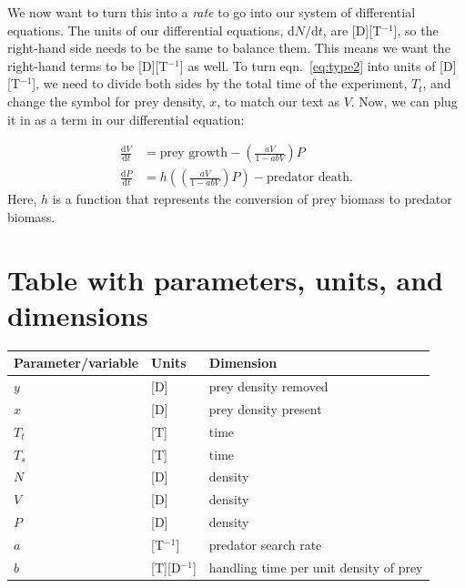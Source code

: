 \documentclass[11pt]{article}
\begin{document}
We now want to turn this into a \emph{rate} to go into our system of differential equations. The units of our differential equations, d$N/$d$t$,  are [D][T$^{-1}$], so the right-hand side needs to be the same to balance them. This means we want the right-hand terms to be [D][T$^{-1}$] as well. To turn eqn.~\ref{eq:type2} into units of [D][T$^{-1}$], we need to divide both sides by the total time of the experiment, $T_t$, and change the symbol for prey density, $x$, to match our text as $V$. Now, we can plug it in as a term in our differential equation:

\begin{equation}
\begin{aligned}
    \frac{\mathrm{d}V}{\mathrm{d}t} &= \text{prey growth} - \left(\frac{aV}{1 - abV}\right)P \\
    \frac{\mathrm{d}P}{\mathrm{d}t} &=  h\left(\left(\frac{aV}{1 - abV}\right)P\right) - \text{predator death}.
\end{aligned}
\end{equation}
Here, $h$ is a function that represents the conversion of prey biomass to predator biomass.

\section{Table with parameters, units, and dimensions}
\begin{tabular}{l l l}
\hline
Parameter/variable & Units & Dimension \\
\hline
$y$ & [D] & prey density removed \\
$x$ & [D] & prey density present \\
$T_t$ & [T] & time \\
$T_s$ & [T] & time \\
$N$ & [D] & density \\
$V$ & [D] & density \\
$P$ & [D] & density \\
$a$ & [T$^{-1}$] & predator search rate \\
$b$ & [T][D$^{-1}$] & handling time per unit density of prey\\
\hline
\end{tabular}


    
\end{document}
